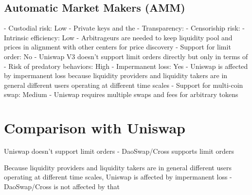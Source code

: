 \documentclass[11pt, reqno]{amsart}
\begin{document}
\subsection{Automatic Market Makers (AMM)}

- Custodial risk: Low
    - Private keys and the
- Transparency:
- Censoriship risk:
- Intrinsic efficiency: Low
    - Arbitrageurs are needed to keep liquidity pool and prices in alignment with other centers for price discovery
- Support for limit order: No
    - Uniswap V3 doesn't support limit orders directly but only in terms of
- Risk of predatory behaviors: High
- Impermanent loss: Yes
    - Uniswap is affected by impermanent loss because liquidity providers and liquidity takers are in general different users operating at different time scales
- Support for multi-coin swap: Medium
	- Uniswap requires multiple swaps and fees for arbitrary tokens

\section{Comparison with Uniswap}

Uniswap doesn't support limit orders
- DaoSwap/Cross supports limit orders

Because liquidity providers and liquidity takers are in general different users
operating at different time scales, Uniswap is affected by impermanent loss
- DaoSwap/Cross is not affected by that






\end{document}
